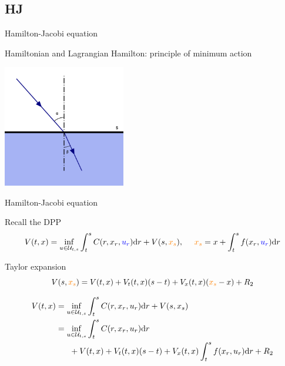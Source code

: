 \documentclass[color=usenames,dvipsnames]{beamer}
\newcommand{\dr}{\text{\normalfont d}r}
\begin{document}
\subsection{HJ}
\begin{frame}{Hamilton-Jacobi equation}
\begin{block}
    {Hamiltonian and Lagrangian}
    Hamilton: principle of minimum action
    \begin{center}
        \includegraphics[width=0.4\textwidth]{Figs/Refracao.png}
    \end{center}
\end{block}
\end{frame}
\begin{frame}{Hamilton-Jacobi equation}
    \begin{block}
        {Recall the DPP}
        \[
        V(t,x) =\inf_{u\in\mathcal{U}_{t,s}}\int_t^sC(r,x_r,{\color{blue}u_r}){{\dr}}+V(s,{\color{orange}x_s}),~~~~{\color{orange}{x}_s}=x+\int_t^sf(x_r,{\color{blue}u_r}){{\dr}}
        \]
    \end{block}
    \begin{block}
        {Taylor expansion}
        \[
V(s,{\color{orange}{x}_s}) = V(t,x) + V_t(t,x)(s-t) + V_x(t,x)({\color{orange}{x}_s}-x) + R_2
\]

\[
\begin{split}
    V(t,x) & =\inf_{u\in\mathcal{U}_{t,s}}\int_t^sC(r,x_r,u_r){{\dr}}+V(s,x_s)\\
    & = \inf_{u\in\mathcal{U}_{t,s}}\int_t^sC(r,x_r,u_r){{\dr}}\\
    & ~~~~~+V(t,x) + V_t(t,x)(s-t) + V_x(t,x)\int_t^s f(x_r,u_r){{\dr}} + R_2
\end{split}
\]
    \end{block}
\end{frame}
\end{document}
